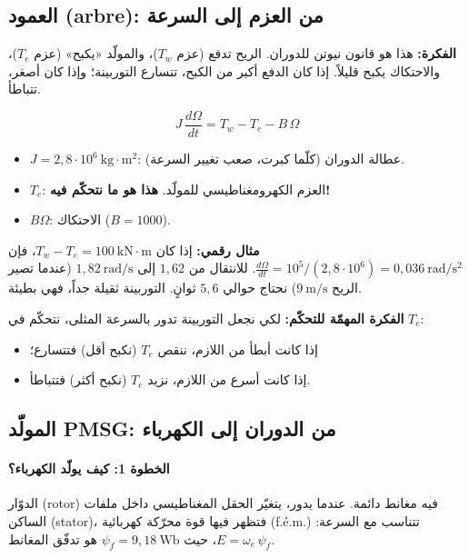 \documentclass[11pt,a4paper]{article}
\newcommand{\fr}[1]{\textfrench{#1}}
\newcommand{\Fikra}{\textbf{الفكرة: }}
\newcommand{\Mithal}{\textbf{مثال رقمي: }}
\begin{document}
\subsection{العمود (\fr{arbre}): من العزم إلى السرعة}
\begin{fikra}
\Fikra
هذا هو قانون نيوتن للدوران. الريح تدفع (عزم $T_w$)، والمولّد «يكبح» (عزم $T_e$)، والاحتكاك يكبح قليلاً.
إذا كان الدفع أكبر من الكبح، تتسارع التوربينة؛ وإذا كان أصغر، تتباطأ.
\end{fikra}
\begin{equation}
J\,\frac{d\Omega}{dt} = T_w - T_e - B\,\Omega
\end{equation}
\begin{itemize}
\item $J=2{,}8\cdot10^6\ \mathrm{kg\cdot m^2}$: عطالة الدوران (كلّما كبرت، صعب تغيير السرعة).
\item $T_e$: العزم الكهرومغناطيسي للمولّد. \textbf{هذا هو ما نتحكّم فيه!}
\item $B\Omega$: الاحتكاك ($B=1000$).
\end{itemize}

\begin{mithal}
\Mithal
إذا كان $T_w - T_e = 100\ \mathrm{kN\cdot m}$، فإن $\frac{d\Omega}{dt} = 10^5/(2{,}8\cdot 10^6) = 0{,}036\ \mathrm{rad/s^2}$.
للانتقال من $1{,}62$ إلى $1{,}82\ \mathrm{rad/s}$ (عندما تصير الريح $9\ \mathrm{m/s}$) نحتاج حوالي $5{,}6$ ثوانٍ.
التوربينة ثقيلة جداً، فهي بطيئة.
\end{mithal}

\textbf{الفكرة المهمّة للتحكّم:} لكي نجعل التوربينة تدور بالسرعة المثلى، نتحكّم في $T_e$:
\begin{itemize}
\item إذا كانت أبطأ من اللازم، ننقص $T_e$ (نكبح أقل) فتتسارع؛
\item إذا كانت أسرع من اللازم، نزيد $T_e$ (نكبح أكثر) فتتباطأ.
\end{itemize}

\subsection{المولّد \fr{PMSG}: من الدوران إلى الكهرباء}

\paragraph{الخطوة 1: كيف يولّد الكهرباء؟}
الدوّار (\fr{rotor}) فيه مغانط دائمة. عندما يدور، يتغيّر الحقل المغناطيسي داخل ملفات الساكن
(\fr{stator})، فتظهر فيها قوة محرّكة كهربائية (\fr{f.é.m.}) تتناسب مع السرعة:
$E = \omega_e\,\psi_f$، حيث $\psi_f=9{,}18\ \mathrm{Wb}$ هو تدفّق المغانط.
\end{document}
